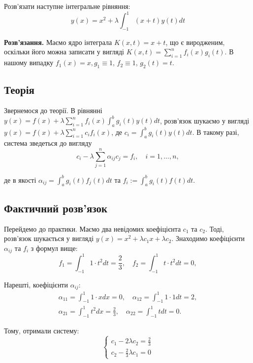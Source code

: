 \documentclass{test_template}
\begin{document}
\begin{problem}
    Розв'язати наступне інтегральне рівняння:
    \begin{equation*}
        y(x) = x^2 + \lambda \int_{-1}^1 (x+t)y(t)dt
    \end{equation*}
\end{problem}

\textbf{Розв'язання.} Маємо ядро інтеграла $K(x,t) = x+t$, що є виродженим,
оскільки його можна записати у вигляді $K(x,t) = \sum_{i=1}^n f_i(x)g_i(t)$. В
нашому випадку $f_1(x) = x, g_1 \equiv 1$, $f_2 \equiv 1$, $g_2(t)=t$. 

\subsection{Теорія}
Звернемося до теорії. В рівнянні $y(x)=f(x)+\lambda\sum_{i=1}^n f_i(x)\int_a^b
g_i(t)y(t)dt$, розв'язок шукаємо у вигляді $y(x) = f(x) + \lambda\sum_{i=1}^n
c_if_i(x)$, де $c_i = \int_a^b g_i(t)y(t)dt$. В такому разі, система зведеться
до вигляду
\begin{equation*}
    c_i - \lambda \sum_{j=1}^n \alpha_{ij}c_j = f_i, \quad i = 1,\dots,n,
\end{equation*}

де в якості $\alpha_{ij} = \int_a^b g_i(t)f_j(t)dt$ та $f_i := \int_a^b
g_i(t)f(t)dt$.

\subsection{Фактичний розв'язок}
Перейдемо до практики. Маємо два невідомих коефіцієнта $c_1$ та $c_2$. Тоді,
розв'язок шукається у вигляді $y(x) = x^2 + \lambda c_1x + \lambda c_2$.
Знаходимо коефіцієнти $\alpha_{ij}$ та $f_i$ з формул вище:
\begin{equation*}
    f_1 = \int_{-1}^1 1 \cdot t^2dt = \frac{2}{3}, \quad f_2 = \int_{-1}^1 t \cdot t^2dt = 0,
\end{equation*}

Нарешті, коефіцієнти $\alpha_{ij}$:
\begin{gather*}
    \alpha_{11} = \int_{-1}^1 1 \cdot xdx = 0, \quad 
    \alpha_{12} = \int_{-1}^1 1 \cdot 1 dt = 2, \\ 
    \alpha_{21} = \int_{-1}^1 t^2 dx = \frac{2}{3}, \quad 
    \alpha_{22} = \int_{-1}^1 tdt = 0.
\end{gather*}

Тому, отримали систему:
\begin{equation*}
    \begin{cases}
        c_1 - 2\lambda c_2 = \frac{2}{3} \\
        c_2 - \frac{2}{3}\lambda c_1 = 0
    \end{cases}
\end{equation*}
\end{document}
